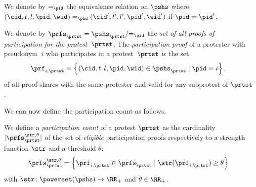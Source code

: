 We denote by \(=_\pid\) the equivalence relation on \(\pshs\) where \((\cid, t, 
l, \pid, \wid) =_\pid (\cid', t', l', \pid', \wid')\) if \(\pid = \pid'\).

\begin{definition}%
  \label{DefParticipationProof}\label{DefParticipationProofs}
  We denote by \(\prfs_\prtst = \pshs_\prtst/{=_\pid}\) the \emph{set of all 
  proofs of participation for the protest~\(\prtst\)}.
  The \emph{participation proof} of a protester with pseudonym~\(i\) who 
  participates in a protest~\(\prtst\) is the set
  \begin{equation}
    \nonumber
    \prf_{i, \prtst} =
    \left\{ (\cid, t, l, \pid, \wid) \in \pshs_\prtst \mid
      \pid = i\right\},
  \end{equation}
  of all proof shares with the same protester and valid for any subprotest of 
  \(\prtst\).
\end{definition}


We can now define the participation count as follows.
\begin{definition}%
  \label{DefParticipationCount}
  We define a \emph{participation count} of a protest \(\prtst\) as the cardinality 
  \(|\prfs_{\prtst}^{\str,\theta}|\) of the set of \emph{eligible} participation proofs respectively to a strength function $\str$ and a threshold $\theta$: \[
    \prfs_{\prtst}^{\str,\theta} = \left\{ \prf_{i,\prtst} \in \prfs_\prtst
      \mid
      \str(\prf_{i,\prtst})\geq \theta \right\}
  \] with \(\str\colon \powerset(\pshs)\to \RR_+\) and  \(\theta \in \RR_+\).
\end{definition}

